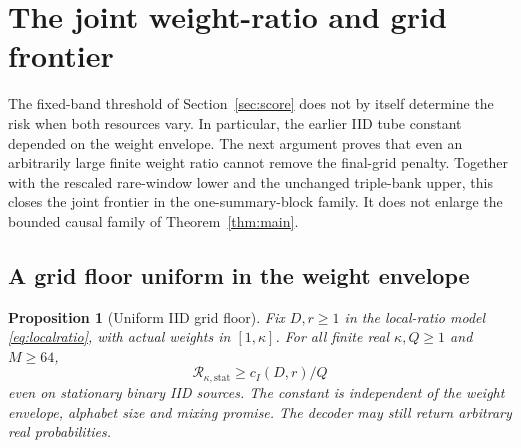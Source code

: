 \documentclass[11pt,letterpaper]{article}
\newtheorem{proposition}[theorem]{Proposition}
\theoremstyle{definition}\newtheorem{definition}[theorem]{Definition}
\theoremstyle{remark}\newtheorem{remark}[theorem]{Remark}
\newcommand{\Risk}{\mathcal{R}}
\begin{document}
\section{The joint weight-ratio and grid frontier}\label{sec:joint}
The fixed-band threshold of Section~\ref{sec:score} does not by itself determine the risk when both resources vary. In particular, the earlier IID tube constant depended on the weight envelope. The next argument proves that even an arbitrarily large finite weight ratio cannot remove the final-grid penalty. Together with the rescaled rare-window lower and the unchanged triple-bank upper, this closes the joint frontier in the one-summary-block family. It does not enlarge the bounded causal family of Theorem~\ref{thm:main}.

\subsection{A grid floor uniform in the weight envelope}
\begin{proposition}[Uniform IID grid floor]\label{prop:iiduniform}
Fix $D,r\ge1$ in the local-ratio model \eqref{eq:localratio}, with actual weights in $[1,\kappa]$. For all finite real $\kappa,Q\ge1$ and $M\ge64$,
\[
 \Risk_{\kappa,\mathrm{stat}}\ge c_I(D,r)/Q
\]
even on stationary binary IID sources. The constant is independent of the weight envelope, alphabet size and mixing promise. The decoder may still return arbitrary real probabilities.
\end{proposition}
\end{document}
